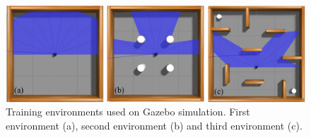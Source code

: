 \begin{figure}[H]
\centerline{\includegraphics[width=\columnwidth]{images/environments1.png}}
\caption{Training environments used on Gazebo simulation. First environment (a), second environment (b) and third environment (c).}
\label{fig:environments}
\end{figure}
